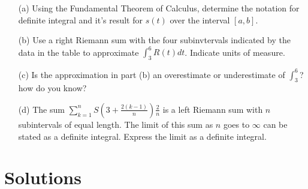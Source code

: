 \documentclass{article}
\newcommand{\qspace}{\vspace*{1.7em}}
\begin{document}
    \begin{enumerate}
        
        \item[(a)] Using the Fundamental Theorem of Calculus, determine the notation for definite integral and it's result 
                   for $s(t)$ over the interval $[a, b]$. \qspace 
        \item[(b)] Use a right Riemann sum with the four subinvtervals indicated by the data in the table to 
                   approximate $\int_3^6 R(t)dt$. Indicate units of measure. \qspace
        \item[(c)] Is the approximation in part (b) an overestimate or underestimate of $\int_3^6$? how do you know? \qspace
        \item[(d)] The sum $\sum_{k = 1}^n S\left(3 + \frac{2(k - 1)}{n}\right)\frac{2}{n}$ is a left Riemann sum with $n$ subintervals of equal length. 
                   The limit of this sum as $n$ goes to $\infty$ can be stated as a definite integral. Express the limit as a definite integral.

    \end{enumerate}
    \newpage



    \section*{Solutions}
\end{document}
